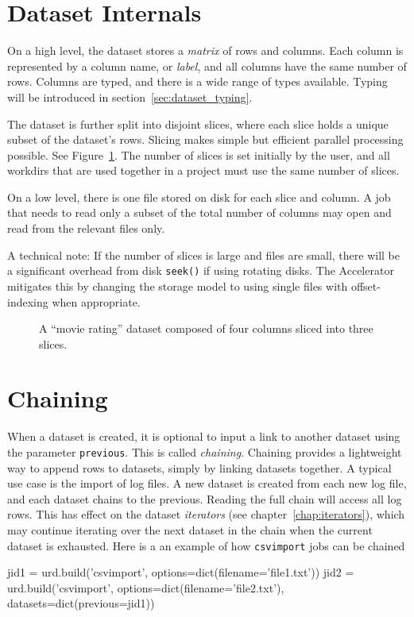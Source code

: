 \section{Dataset Internals}

On a high level, the dataset stores a \textsl{matrix} of rows and
columns.  Each column is represented by a column name,
or \emph{label}, and all columns have the same number of rows.
Columns are typed, and there is a wide range of types available.
Typing will be introduced in section~\ref{sec:dataset_typing}.

The dataset is further split into disjoint slices, where each slice
holds a unique subset of the dataset's rows.  Slicing makes simple but
efficient parallel processing possible.  See Figure~\ref{fig:slices}.
The number of slices is set initially by the user, and all workdirs
that are used together in a project must use the same number of
slices.

On a low level, there is one file stored on disk for each slice and
column.  A job that needs to read only a subset of the total number of
columns may open and read from the relevant files only.

A technical note: If the number of slices is large and files are
small, there will be a significant overhead from disk \texttt{seek()}
if using rotating disks.  The Accelerator mitigates this by changing
the storage model to using single files with offset-indexing when
appropriate.

\begin{figure}[b!]
  \begin{center}
     
     \caption{A ``movie rating'' dataset composed of four columns
              sliced into three slices.}
     \label{fig:slices}
  \end{center}
\end{figure}


\section{Chaining}
When a dataset is created, it is optional to input a link to another
dataset using the parameter \texttt{previous}.  This is called
\emph{chaining}.  Chaining provides a lightweight way to append rows
to datasets, simply by linking datasets together.  A typical use case
is the import of log files.  A new dataset is created from each new
log file, and each dataset chains to the previous.  Reading the full
chain will access all log rows.  This has effect on the dataset
\emph{iterators} (see chapter~\ref{chap:iterators}), which may continue iterating
over the next dataset in the chain when the current dataset is
exhausted.  Here is a an example of how \texttt{csvimport} jobs can be
chained
\begin{python}
jid1 = urd.build('csvimport', options=dict(filename='file1.txt'))
jid2 = urd.build('csvimport', options=dict(filename='file2.txt'),
                              datasets=dict(previous=jid1))
\end{python}



